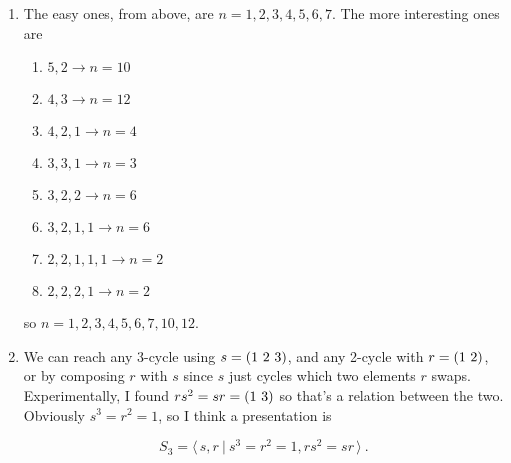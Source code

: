 \documentclass[]{article}
\newcommand*{\cycle}[1]{( \foreach \entry [count=\i] in {#1} {\ifnum\i>1\ \fi\entry})}
\begin{document}
\begin{enumerate}
\item The easy ones, from above, are $n = 1,2,3,4,5,6,7$. The more interesting ones are
\begin{enumerate}
\item $5,2 \rightarrow n = 10$
\item $4,3 \rightarrow n = 12$
\item $4,2,1 \rightarrow n = 4$
\item $3,3,1 \rightarrow n = 3$
\item $3,2,2 \rightarrow n = 6$
\item $3,2,1,1 \rightarrow n = 6$
\item $2,2,1,1,1 \rightarrow n = 2$
\item $2,2,2,1 \rightarrow n = 2$
\end{enumerate}
so $n = 1,2,3,4,5,6,7,10,12$.


\item We can reach any 3-cycle using $s = \cycle{1,2,3}$, and any 2-cycle with $r = \cycle{1,2}$, or by composing $r$ with $s$ since $s$ just cycles which two elements $r$ swaps. Experimentally, I found $rs^2 = sr = \cycle{1,3}$ so that's a relation between the two. Obviously $s^3 = r^2 = 1$, so I think a presentation is

\begin{equation}
S_3 = \langle\, s,r\ \vert\ s^3=r^2=1, rs^2 = sr\, \rangle\ .
\end{equation}

\end{enumerate}
\end{document}

